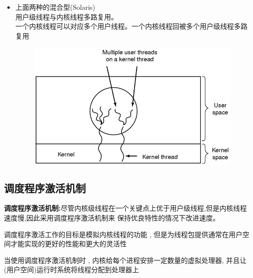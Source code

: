 \documentclass[UTF8,a4paper]{ctexart}
\newcommand{\spaceline}{\vspace{\baselineskip}}
\begin{document}
\begin{itemize}
\begin{figure}[H]
	      \end{figure}
	\item 上面两种的混合型(Solaris)\\
	      用户级线程与内核线程多路复用。\\
	      一个内核线程可以对应多个用户线程。一个内核线程回被多个用户级线程多路复用
	      \begin{figure}[H]
		      \centering
		      \includegraphics[scale = 0.3]{assets/ModernOperatingSystems_416b1.png}
	      \end{figure}
\end{itemize}

\subsection{调度程序激活机制}

\textbf{调度程序激活机制:}尽管内核级线程在一个关键点上优于用户级线程,但是内核线程速度慢,因此采用调度程序激活机制来
保持优良特性的情况下改进速度。

调度程序激活工作的目标是模拟内核线程的功能 , 但是为线程包提供通常在用户空间才能实现的更好的性能和更大的灵活性

当使用调度程序激活机制时 , 内核给每个进程安排一定数量的虚拟处理器, 并且让(用户空间)运行时系统将线程分配到处理器上

\end{document}
